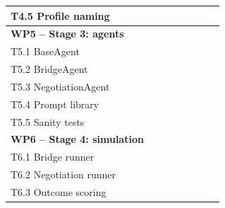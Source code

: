\documentclass[11pt, a4paper, oneside, openany]{report}
\begin{document}
\begin{table}[H]
\begin{tabular}{|p{4.0cm}|c|c|c|c|c|c|c|c|c|c|}
T4.5 Profile naming             &                    &                    &                    & \cellcolor{wplight}&                    &                    &                    &                    &                    &                    \\
\hline
\multicolumn{11}{|l|}{\textbf{WP5 -- Stage 3: agents}} \\
\hline
T5.1 BaseAgent                  &                    &                    &                    &                    & \cellcolor{wpcrit} &                    &                    &                    &                    &                    \\
T5.2 BridgeAgent                &                    &                    &                    &                    & \cellcolor{wpcrit} & \cellcolor{wpcrit} &                    &                    &                    &                    \\
T5.3 NegotiationAgent           &                    &                    &                    &                    & \cellcolor{wpcrit} & \cellcolor{wpcrit} &                    &                    &                    &                    \\
T5.4 Prompt library             &                    &                    &                    &                    & \cellcolor{wpcrit} & \cellcolor{wpcrit} &                    &                    &                    &                    \\
T5.5 Sanity tests               &                    &                    &                    &                    &                    & \cellcolor{wplight}&                    &                    &                    &                    \\
\hline
\multicolumn{11}{|l|}{\textbf{WP6 -- Stage 4: simulation}} \\
\hline
T6.1 Bridge runner              &                    &                    &                    &                    &                    &                    & \cellcolor{wpcrit} &                    &                    &                    \\
T6.2 Negotiation runner         &                    &                    &                    &                    &                    &                    & \cellcolor{wpcrit} & \cellcolor{wpcrit} &                    &                    \\
T6.3 Outcome scoring            &                    &                    &                    &                    &                    &                    & \cellcolor{wpcrit} &                    &                    &                    \\

\end{tabular}
\end{table}
\end{document}
